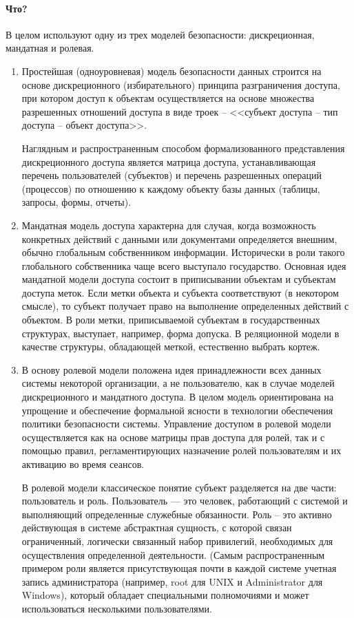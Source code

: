 \paragraph{Что?}
В целом используют одну из трех моделей безопасности: дискреционная, мандатная и ролевая.
\begin{enumerate}
	\item Простейшая (одноуровневая) модель безопасности данных строится на основе дискреционного (избирательного) принципа разграничения доступа, при котором доступ к объектам осуществляется на основе множества разрешенных отношений доступа в виде троек -- <<субъект доступа -- тип доступа -- объект доступа>>.

	Наглядным и распространенным способом формализованного представления дискреционного доступа является матрица доступа, устанавливающая перечень пользователей (субъектов) и перечень разрешенных операций (процессов) по отношению к каждому объекту базы данных (таблицы, запросы, формы, отчеты).

	\item Мандатная модель доступа характерна для случая, когда возможность конкретных действий с данными или документами определяется внешним, обычно глобальным собственником информации. Исторически в роли такого глобального собственника чаще всего выступало государство. Основная идея мандатной модели доступа состоит в приписывании объектам и субъектам доступа меток. Если метки объекта и субъекта соответствуют (в некотором смысле), то субъект получает право на выполнение определенных действий с объектом. В роли метки, приписываемой субъектам в государственных структурах, выступает, например, форма допуска. В реляционной модели в качестве структуры, обладающей меткой, естественно выбрать кортеж.

	\item В основу ролевой модели положена идея принадлежности всех данных системы некоторой организации, а не пользователю, как в случае моделей дискреционного и мандатного доступа. В целом модель ориентирована на упрощение и обеспечение формальной ясности в технологии обеспечения политики безопасности системы. Управление доступом в ролевой модели осуществляется как на основе матрицы прав доступа для ролей, так и с помощью правил, регламентирующих назначение ролей пользователям и их
	активацию во время сеансов.

	В ролевой модели классическое понятие субъект разделяется на две части: пользователь и роль. Пользователь — это человек, работающий с системой и выполняющий определенные служебные обязанности. Роль -- это активно действующая в системе абстрактная сущность, с которой связан ограниченный, логически связанный набор привилегий, необходимых для осуществления определенной деятельности. (Самым распространенным примером роли явля­ется присутствующая почти в каждой системе учетная запись администратора (например, root для UNIX и Administrator для Windows), который обладает специальными полномочиями и может использоваться несколькими пользователями.


\end{enumerate}
